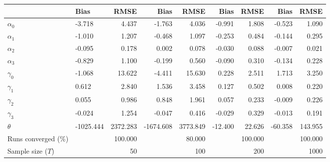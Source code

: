 
\begin{tabular}[t]{llrrrrrrr}
\toprule
  & Bias & RMSE & Bias & RMSE & Bias & RMSE & Bias & RMSE\\
\midrule
$\alpha_{0}$ & -3.718 & 4.437 & -1.763 & 4.036 & -0.991 & 1.808 & -0.523 & 1.090\\
$\alpha_{1}$ & -1.010 & 1.207 & -0.468 & 1.097 & -0.253 & 0.484 & -0.144 & 0.295\\
$\alpha_{2}$ & -0.095 & 0.178 & 0.002 & 0.078 & -0.030 & 0.088 & -0.007 & 0.021\\
$\alpha_{3}$ & -0.829 & 1.100 & -0.199 & 0.560 & -0.090 & 0.310 & -0.134 & 0.228\\
$\gamma_{0}$ & -1.068 & 13.622 & -4.411 & 15.630 & 0.228 & 2.511 & 1.713 & 3.250\\
$\gamma_{1}$ & 0.612 & 2.840 & 1.536 & 3.458 & 0.127 & 0.502 & 0.008 & 0.220\\
$\gamma_{2}$ & 0.055 & 0.986 & 0.848 & 1.961 & 0.057 & 0.233 & -0.009 & 0.226\\
$\gamma_{3}$ & -0.024 & 1.254 & -0.047 & 0.416 & -0.029 & 0.329 & -0.013 & 0.191\\
$\theta$ & -1025.444 & 2372.283 & -1674.608 & 3773.849 & -12.400 & 22.626 & -60.358 & 143.955\\
Runs converged (\%) &  & 100.000 &  & 80.000 &  & 100.000 &  & 100.000\\
Sample size ($T$) &  & 50 &  & 100 &  & 200 &  & 1000\\
\bottomrule
\end{tabular}
